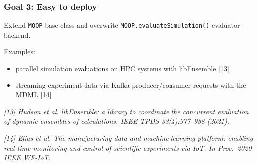 \documentclass[aspectratio=169]{beamer}
\begin{document}
\begin{frame}\frametitle{Goal 3: Easy to deploy}

Extend {\tt MOOP} base class and overwrite {\tt MOOP.evaluateSimulation()}
evaluator backend.

\pause
\bigskip

Examples:
\begin{itemize}
\item parallel simulation evaluations on HPC systems with libEnsemble [13]
\item streaming experiment data via Kafka producer/consumer requests with the MDML [14]
\end{itemize}

\vfill

{\tiny\it
[13] Hudson et al.
libEnsemble: a library to coordinate the concurrent evaluation of dynamic ensembles of calculations.
IEEE TPDS 33(4):977--988 (2021).\\
}

\medskip

{\tiny\it
[14] Elias et al.
The manufacturing data and machine learning platform: enabling real-time monitoring and control of scientific experiments via IoT.
In Proc.\ 2020 IEEE WF-IoT.\\
}

\end{frame}
\end{document}
